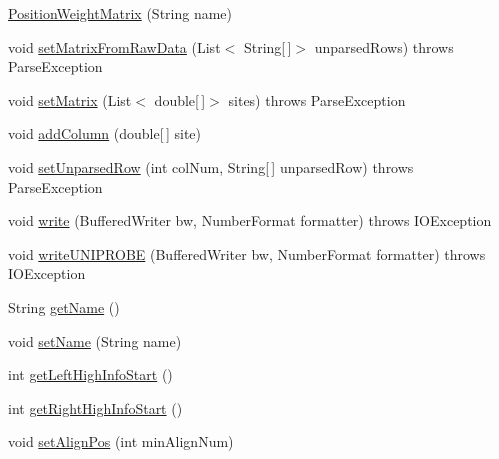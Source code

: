 \begin{DoxyCompactItemize}
\item 
\hyperlink{classbroad_1_1core_1_1motif_1_1_position_weight_matrix_a93721c18375954e6ca86dc9e819c70c3}{Position\+Weight\+Matrix} (String name)
\item 
void \hyperlink{classbroad_1_1core_1_1motif_1_1_position_weight_matrix_a987b71b7f2d6cb595bee270cdf8e682a}{set\+Matrix\+From\+Raw\+Data} (List$<$ String\mbox{[}$\,$\mbox{]}$>$ unparsed\+Rows)  throws Parse\+Exception
\item 
void \hyperlink{classbroad_1_1core_1_1motif_1_1_position_weight_matrix_a430da298fb10b0fbb57e4e34f49668b8}{set\+Matrix} (List$<$ double\mbox{[}$\,$\mbox{]}$>$ sites)  throws Parse\+Exception
\item 
void \hyperlink{classbroad_1_1core_1_1motif_1_1_position_weight_matrix_a983173efce4331498fa601048882f849}{add\+Column} (double\mbox{[}$\,$\mbox{]} site)
\item 
void \hyperlink{classbroad_1_1core_1_1motif_1_1_position_weight_matrix_adad83edc20996566232161bb9d5f253f}{set\+Unparsed\+Row} (int col\+Num, String\mbox{[}$\,$\mbox{]} unparsed\+Row)  throws Parse\+Exception 
\item 
void \hyperlink{classbroad_1_1core_1_1motif_1_1_position_weight_matrix_a01be23a72b73f927358f5ceb6dcb028f}{write} (Buffered\+Writer bw, Number\+Format formatter)  throws I\+O\+Exception 
\item 
void \hyperlink{classbroad_1_1core_1_1motif_1_1_position_weight_matrix_accb2106d462932acb04df43c74781752}{write\+U\+N\+I\+P\+R\+O\+B\+E} (Buffered\+Writer bw, Number\+Format formatter)  throws I\+O\+Exception 
\item 
String \hyperlink{classbroad_1_1core_1_1motif_1_1_position_weight_matrix_a9c4f72f0173e0b84b3e3a732d9de22fc}{get\+Name} ()
\item 
void \hyperlink{classbroad_1_1core_1_1motif_1_1_position_weight_matrix_a52521dce3a38dcc4eb1734e886b5d870}{set\+Name} (String name)
\item 
int \hyperlink{classbroad_1_1core_1_1motif_1_1_position_weight_matrix_a2fe7ed8e3b005e43dbe66784519cd37d}{get\+Left\+High\+Info\+Start} ()
\item 
int \hyperlink{classbroad_1_1core_1_1motif_1_1_position_weight_matrix_a7f0911cdd2e978b07ab07c680415dfda}{get\+Right\+High\+Info\+Start} ()
\item 
void \hyperlink{classbroad_1_1core_1_1motif_1_1_position_weight_matrix_a8817e48c123afc0c6c15a30686777a5e}{set\+Align\+Pos} (int min\+Align\+Num)

\end{DoxyCompactItemize}
